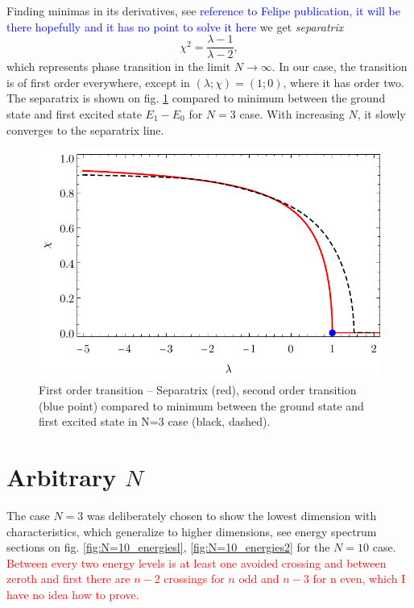 Finding minimas in its derivatives, see \textcolor{blue}{reference to Felipe publication, it will be there hopefully and it has no point to solve it here} we get \emph{separatrix}
\begin{equation}
    \chi^2=\frac{\lambda-1}{\lambda-2},
    \label{eq:separatrix}
\end{equation}
which represents phase transition in the limit $N\rightarrow \infty$. In our case, the transition is of first order everywhere, except in $(\lambda;\chi)=(1;0)$, where it has order two. The separatrix is shown on fig. \ref{fig:transitionCompare} compared to minimum between the ground state and first excited state $E_1-E_0$ for $N=3$ case. With increasing $N$, it slowly converges to the separatrix line.

\begin{figure}[h]
    \centering
    \includegraphics{../img/infiniteN_transitionCompare.pdf}
    \caption{First order transition -- Separatrix (red), second order transition (blue point) compared to minimum between the ground state and first excited state in N=3 case (black, dashed).}
    \label{fig:transitionCompare}    
\end{figure}

\section{Arbitrary $N$}
The case $N=3$ was deliberately chosen to show the lowest dimension with characteristics, which generalize to higher dimensions, see energy spectrum sections on fig. \ref{fig:N=10_energiesl}, \ref{fig:N=10_energies2} for the $N=10$ case. \textcolor{red}{Between every two energy levels is at least one avoided crossing and between zeroth and first there are $n-2$ crossings for $n$ odd and $n-3$ for n even, which I have no idea how to prove.} 

